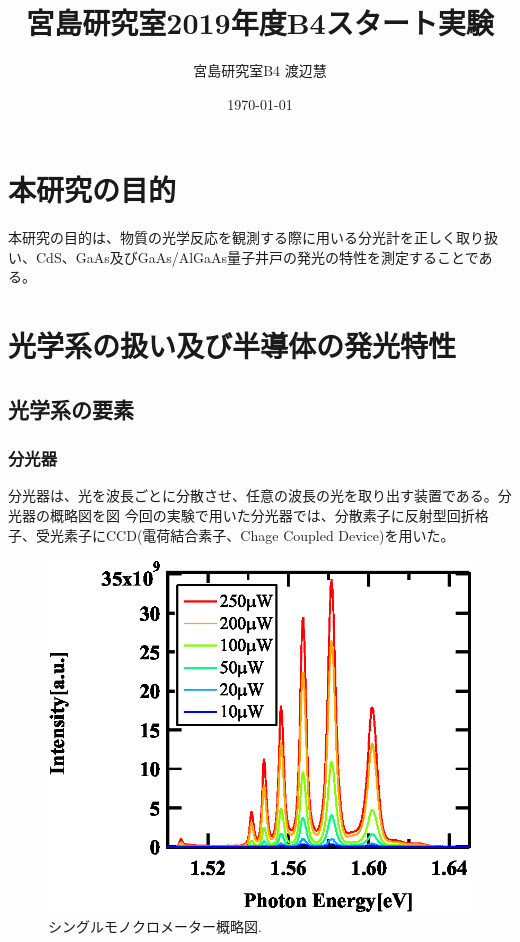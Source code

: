 \documentclass[11pt,a4j]{jsarticle}
\title{宮島研究室2019年度B4スタート実験}
\author{宮島研究室B4 渡辺慧}
\date{\today}
\begin{document}
\maketitle %






\newpage
\section{本研究の目的}
本研究の目的は、物質の光学反応を観測する際に用いる分光計を正しく取り扱い、CdS、GaAs及びGaAs/AlGaAs量子井戸の発光の特性を測定することである。

\newpage
\section{光学系の扱い及び半導体の発光特性}

\subsection{光学系の要素}
\subsubsection{分光器}

分光器は、光を波長ごとに分散させ、任意の波長の光を取り出す装置である。分光器の概略図を図%
今回の実験で用いた分光器では、分散素子に反射型回折格子、受光素子にCCD(電荷結合素子、Chage Coupled Device)を用いた。

\begin{figure}[h]
	\centering
	\includegraphics[clip]{mqw_77_spec.eps}
	\caption{シングルモノクロメーター概略図.}
	\label{fig_monochro1}
\end{figure}
\end{document}
